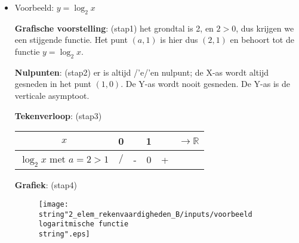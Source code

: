 \begin{itemize}
\item{Voorbeeld: ${\displaystyle y=\log_{2}x}$}

\textbf{Grafische voorstelling}: (stap1) het grondtal is 2, en $2>0$,
dus krijgen we een stijgende functie. Het punt $(a,1)$ is hier dus
$(2,1)$ en behoort tot de functie ${\displaystyle y=\log_{2}x}$.\medskip{}


\noindent \textbf{Nulpunten}: (stap2) er is altijd /'e/'en nulpunt; de
X-as wordt altijd gesneden in het punt $(1,0)$. De Y-as wordt nooit
gesneden. De Y-as is de verticale asymptoot.\medskip{}


\noindent \textbf{Tekenverloop}: (stap3) %
\begin{tabular}{|c||c|c|c|c|c|}
	\hline 
	$x$ & 0 &  & 1 &  & ${\displaystyle \longrightarrow\mathbb{R}}$\tabularnewline
	\hline 
	\hline 
	${\displaystyle \log_{2}x}$ met $a=2>1$ & $/$ & - & 0 & + & \multicolumn{1}{c|}{}\tabularnewline
	\hline 
\end{tabular}

\noindent \textbf{Grafiek}: (stap4) 
\begin{figure}
	\texttt{[image: \\string"2\_elem\_rekenvaardigheden\_B/inputs/voorbeeld logaritmische functie\\string".eps]}
\end{figure}
\end{itemize}

